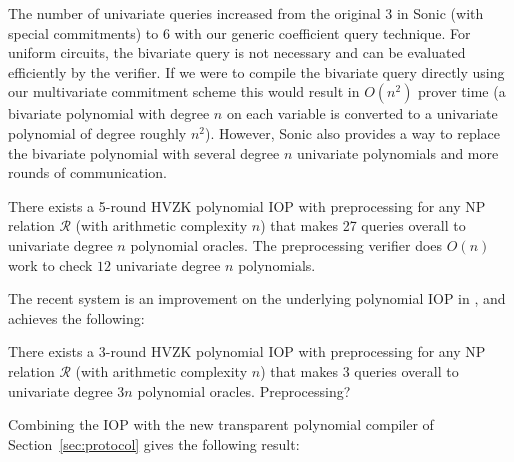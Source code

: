 The number of univariate queries increased from the original $3$ in \textsf{Sonic} (with special commitments) to $6$ with our generic coefficient query technique. For uniform circuits, the bivariate query is not necessary and can be evaluated efficiently by the verifier. If we were to compile the bivariate query directly using our multivariate commitment scheme this would result in $O(n^2)$ prover time (a bivariate polynomial with degree $n$ on each variable is converted to a univariate polynomial of degree roughly $n^2$). However, \textsf{Sonic} also provides a way to replace the bivariate polynomial with several degree $n$ univariate polynomials and more rounds of communication. 

\begin{theorem}\label{thm:sonic} 
There exists a 5-round HVZK polynomial IOP with preprocessing for any NP relation $\mathcal{R}$ (with arithmetic complexity $n$) that makes 27 queries overall to univariate degree $n$ polynomial oracles. The preprocessing verifier does $O(n)$ work to check $12$ univariate degree $n$ polynomials. 
\end{theorem}


The recent system  is an improvement on the underlying polynomial IOP in , and achieves the following: 

\begin{theorem} 
There exists a 3-round HVZK polynomial IOP with preprocessing for any NP relation $\mathcal{R}$ (with arithmetic complexity $n$) that makes 3 queries overall to univariate degree $3n$ polynomial oracles. Preprocessing? %
\end{theorem}

Combining the  IOP with the new transparent polynomial compiler of Section~\ref{sec:protocol} gives the following result:  

